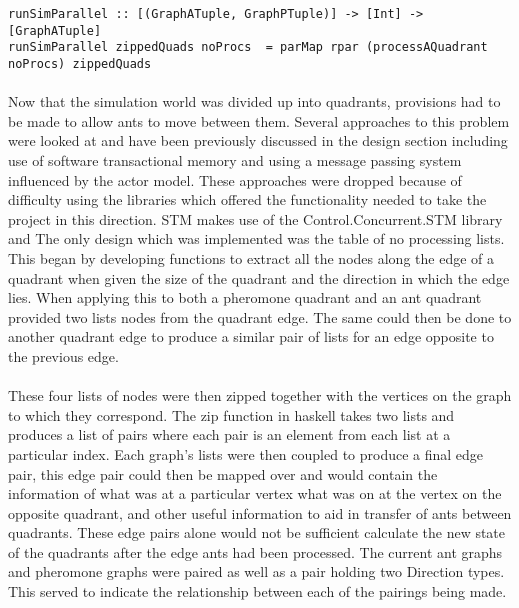 \documentclass[main.tex]{subfiles}
\begin{document}
\begin{lstlisting}
runSimParallel :: [(GraphATuple, GraphPTuple)] -> [Int] ->  [GraphATuple]
runSimParallel zippedQuads noProcs  = parMap rpar (processAQuadrant noProcs) zippedQuads
\end{lstlisting}

\paragraph{}Now that the simulation world was divided up into quadrants, provisions had to be made to allow ants to move between them. Several approaches to this problem were looked at and have been previously discussed in the design section including use of software transactional memory and using a message passing system influenced by the actor model. These approaches were dropped because of difficulty using the libraries which offered the functionality needed to take the project in this direction. STM makes use of the Control.Concurrent.STM library and 
The only design which was implemented was the table of no processing lists. This began by developing functions to extract all the nodes along the edge of a quadrant when given the size of the quadrant and the direction in which the edge lies. When applying this to both a pheromone quadrant and an ant quadrant provided two lists nodes from the quadrant edge. The same could then be done to another quadrant edge to produce a similar pair of lists for an edge opposite to the previous edge.


\paragraph{}These four lists of nodes were then zipped together with the vertices on the graph to which they correspond. The zip function in haskell takes two lists and produces a list of pairs where each pair is an element from each list at a particular index. Each graph's lists were then coupled to produce a final edge pair, this edge pair could then be mapped over and would contain the information of what was at a particular vertex what was on at the vertex on the opposite quadrant, and other useful information to aid in transfer of ants between quadrants. These edge pairs alone would not be sufficient calculate the new state of the quadrants after the edge ants had been processed. The current ant graphs and pheromone graphs were paired as well as a pair holding two Direction types. This served to indicate the relationship between each of the pairings being made.
\end{document}
